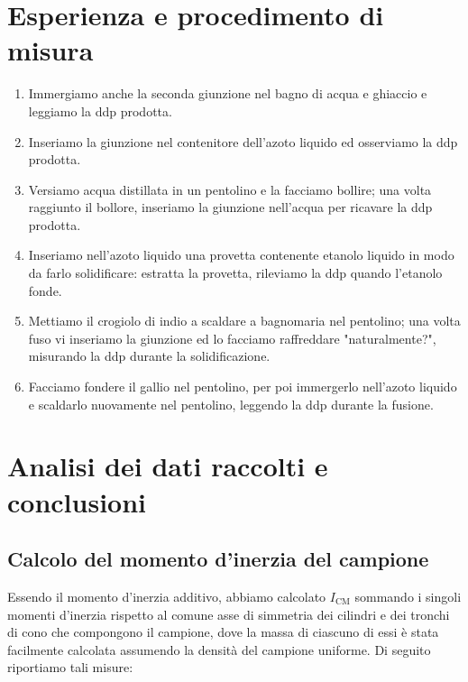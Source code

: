 \documentclass{article}
\begin{document}
\section{Esperienza e procedimento di misura}
\begin{enumerate}
    \item
        Immergiamo anche la seconda giunzione nel bagno
        di acqua e ghiaccio e leggiamo la ddp prodotta.
    \item
        Inseriamo la giunzione nel contenitore dell'azoto
        liquido ed osserviamo la ddp prodotta.
    \item
        Versiamo acqua distillata in un pentolino e la
        facciamo bollire; una volta raggiunto il bollore,
        inseriamo la giunzione nell'acqua per ricavare la ddp prodotta.
    \item
        Inseriamo nell'azoto liquido una provetta contenente
        etanolo liquido in modo da farlo solidificare:
        estratta la provetta, rileviamo la ddp quando
        l'etanolo fonde.
    \item
        Mettiamo il crogiolo di indio a scaldare a bagnomaria
        nel pentolino; una volta fuso vi inseriamo la giunzione
        ed lo facciamo raffreddare "naturalmente?", misurando
        la ddp durante la solidificazione.
    \item
        Facciamo fondere il gallio nel pentolino, per poi
        immergerlo nell'azoto liquido e scaldarlo nuovamente
        nel pentolino, leggendo la ddp durante la fusione.

\end{enumerate}

\section{Analisi dei dati raccolti e conclusioni}
\subsection{Calcolo del momento d'inerzia del campione}

Essendo il momento d'inerzia additivo, abbiamo calcolato
$I_\text{CM}$ sommando i singoli momenti d'inerzia rispetto al comune
asse di simmetria dei cilindri e dei tronchi di cono che compongono il
campione, dove la massa di ciascuno di essi è stata facilmente
calcolata assumendo la densità del campione uniforme.
Di seguito riportiamo tali misure:
\end{document}
